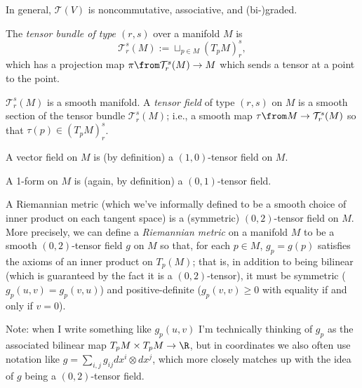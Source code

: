In general, $\mathcal{T}(V)$ is noncommutative, associative, and (bi-)graded.

\begin{definition}\label{def:tensor bundle}
	The \emph{tensor bundle of type $(r,s)$} over a manifold $M$ is
	\[
		\mathcal{T}_r^s(M) := \sqcup_{p \in M} \left(T_pM\right)_r^s,
	\]
	which has a projection map $\pi\from \mathcal{T}_r^s(M) \to M$ which sends a tensor at a point to the point. 
	
	$\mathcal{T}_r^s(M)$ is a smooth manifold. A \emph{tensor field} of type $(r,s)$ on $M$ is a smooth section of the tensor bundle $\mathcal{T}_r^s(M)$; i.e., a smooth map $\tau\from M \to \mathcal{T}_r^s(M)$ so that $\tau(p) \in \left(T_p M\right)_r^s$.
\end{definition}

\begin{example}
	A vector field on $M$ is (by definition) a $(1,0)$-tensor field on $M$.
\end{example}

\begin{example}
	A 1-form on $M$ is (again, by definition) a $(0,1)$-tensor field.
\end{example}

\begin{example}
	A Riemannian metric (which we've informally defined to be a smooth choice of inner product on each tangent space) is a (symmetric) $(0,2)$-tensor field on $M$. More precisely, we can define a \emph{Riemannian metric} on a manifold $M$ to be a smooth $(0,2)$-tensor field $g$ on $M$ so that, for each $p \in M$, $g_p = g(p)$ satisfies the axioms of an inner product on $T_p(M)$; that is, in addition to being bilinear (which is guaranteed by the fact it is a $(0,2)$-tensor), it must be symmetric ($g_p(u,v) = g_p(v,u)$) and positive-definite ($g_p(v,v) \geq 0$ with equality if and only if $v=0$).
	
	Note: when I write something like $g_p(u,v)$ I'm technically thinking of $g_p$ as the associated bilinear map $T_pM \times T_pM \to \R$, but in coordinates we also often use notation like $g = \sum_{i,j} g_{ij} dx^i \otimes dx^j$, which more closely matches up with the idea of $g$ being a $(0,2)$-tensor field.
\end{example}

